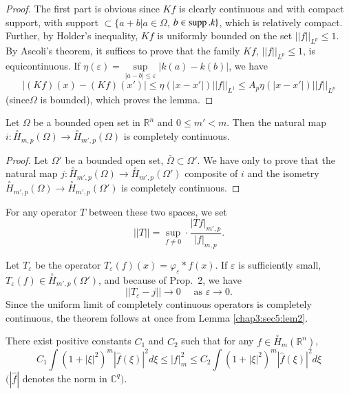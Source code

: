 \begin{proof}
  The first part is obvious since $K f$ is clearly continuous and with
  compact support, with support $\subset \{a +b | a \in \Omega$, $b
  \in \operatorname{supp}. k  \}$, which  is relatively compact. Further, by
  Holder's inequality, $Kf$ is uniformly bounded on the set $|| f
  ||_{L^p} \le 1$. By Ascoli's theorem, it suffices to prove that the
  family $Kf$, $|| f ||_{L^p} \le 1$, is equicontinuous. If $\eta
  (\varepsilon) = \sup\limits_{| a - b| \le \varepsilon} | k(a) - k(b)
  |$, we have  
  $$
  | (Kf ) (x) - (Kf ) (x') | \le \eta (|x - x'|) || f ||_{L^1} \le A_p
  \eta (| x - x'|) || f ||_{L^p} 
  $$ 
  (since\pageoriginale $\Omega$ is bounded), which proves the lemma.
\end{proof}

\setcounter{theorem}{0}
\begin{theorem}[Rellich]\label{chap3:sec5:thm1} %
  Let $\Omega$ be a bounded open set in
  $\mathbb{R}^n$ and $0 \le m' < m$. Then the natural map $i :
  \overset{\circ}{H}_{m, p} (\Omega) \to \overset{\circ}{H}_{m' , p}
  (\Omega)$ is completely continuous.  
\end{theorem}

\begin{proof}
  Let $\Omega'$ be a bounded open set, $\bar{\Omega} \subset
  \Omega'$. We have only to prove that the natural map $j :
  \overset{\circ}{H}_{m' , p} (\Omega) \to \overset{\circ}{H}_{m' , p}
  (\Omega') $ composite of $i$ and the isometry $\overset{\circ}{H}_{m' ,
    p} (\Omega) \to \overset{\circ}{H}_{m' , p} (\Omega')$ is completely
  continuous. 
\end{proof}

For any operator $T$ between these two spaces, we set 
$$
|| T|| =\sup\limits_{f \neq 0}\cdot  \dfrac{| Tf |_{m' , p}}{| f|_{m,
    p}}.
$$ 

Let $T_ \varepsilon$ be the operator $T_ \varepsilon (f) (x) =
\varphi_ \varepsilon * f(x)$. If $\varepsilon$ is sufficiently small,
$T_ \varepsilon (f) \in \overset{\circ}{H}_{m' , p} (\Omega')$, and
because of Prop.~2, we have  
$$
|| T_ \varepsilon - j || \to 0 \quad \text { as } \varepsilon \to 0.
$$
Since the uniform limit of completely continuous operators is
completely continuous, the theorem follows at once from
Lemma \ref{chap3:sec5:lem2}. 

\begin{proposition}\label{chap3:sec5:prop3} %
  There exist positive constants $C_1$ and $C_2$ such that for any $f
  \in \overset{\circ}{H}_{m} (\mathbb{R}^n)$, 
  $$
  C_1 \int (1+ | \xi |^2)^m | \hat{f} (\xi ) |^2 d \xi \le | f |^2_m
  \le C_2 \int ( 1+ | \xi |^2)^m | \hat {f} (\xi) |^2 d \xi 
  $$
  $(| \hat{f} |$ denotes the norm in $\mathbb{C}^q )$.
\end{proposition}


